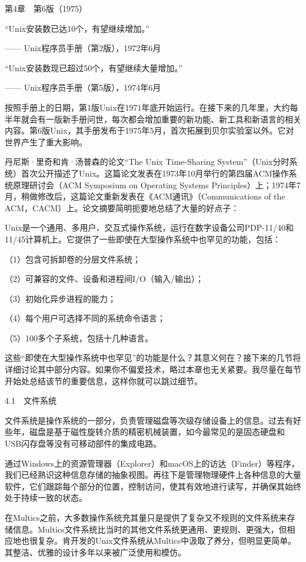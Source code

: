 \documentclass[a4paper,12pt,UTF8,twoside]{ctexbook}
\begin{document}
{第4章　第6版（1975）


“Unix安装数已达10个，有望继续增加。”

—— Unix程序员手册（第2版），1972年6月

“Unix安装数现已超过50个，有望继续大量增加。”

—— Unix程序员手册（第5版），1974年6月

按照手册上的日期，第1版Unix在1971年底开始运行。在接下来的几年里，大约每半年就会有一版新手册问世，每次都会增加重要的新功能、新工具和新语言的相关内容。第6版Unix，其手册发布于1975年5月，首次拓展到贝尔实验室以外。它对世界产生了重大影响。

丹尼斯·里奇和肯·汤普森的论文“The Unix Time-Sharing System”（Unix分时系统）首次公开描述了Unix。这篇论文发表在1973年10月举行的第四届ACM操作系统原理研讨会（ACM Symposium on Operating Systems Principles）上；1974年7月，稍做修改后，这篇论文重新发表在《ACM通讯》（Communications of the ACM，CACM）上。论文摘要简明扼要地总结了大量的好点子：

Unix是一个通用、多用户、交互式操作系统，运行在数字设备公司PDP-11/40和11/45计算机上。它提供了一些即使在大型操作系统中也罕见的功能，包括：

（1）包含可拆卸卷的分层文件系统；

（2）可兼容的文件、设备和进程间I/O（输入/输出）；

（3）初始化异步进程的能力；

（4）每个用户可选择不同的系统命令语言；

（5）100多个子系统，包括十几种语言。



这些“即使在大型操作系统中也罕见”的功能是什么？其意义何在？接下来的几节将详细讨论其中部分内容。如果你不偏爱技术，略过本章也无关紧要。我尽量在每节开始处总结该节的重要信息，这样你就可以跳过细节。





4.1　文件系统


文件系统是操作系统的一部分，负责管理磁盘等次级存储设备上的信息。过去有好些年，磁盘是基于磁性旋转介质的精密机械装置，如今最常见的是固态硬盘和USB闪存盘等没有可移动部件的集成电路。

通过Windows上的资源管理器（Explorer）和macOS上的访达（Finder）等程序，我们已经熟识这种信息存储的抽象视图。再往下是管理物理硬件上各种信息的大量软件，它们跟踪每个部分的位置，控制访问，使其有效地进行读写，并确保其始终处于持续一致的状态。

在Multics之前，大多数操作系统充其量只是提供了复杂又不规则的文件系统来存储信息。Multics文件系统比当时的其他文件系统更通用、更规则、更强大，但相应地也很复杂。肯开发的Unix文件系统从Multics中汲取了养分，但明显更简单。其整洁、优雅的设计多年以来被广泛使用和模仿。

}
\end{document}
